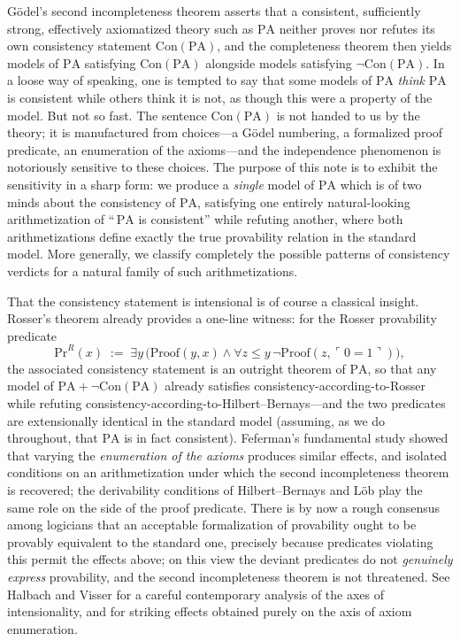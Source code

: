\documentclass[11pt]{amsart}
\theoremstyle{definition}
\theoremstyle{remark}
\newcommand{\PA}{\mathrm{PA}}
\newcommand{\Con}{\mathrm{Con}}
\newcommand{\Pf}{\mathrm{Proof}}
\newcommand{\Prov}{\mathrm{Pr}}
\newcommand{\godel}[1]{\ulcorner #1 \urcorner}
\begin{document}
G\"odel's second incompleteness theorem asserts that a consistent,
sufficiently strong, effectively axiomatized theory such as $\PA$ neither
proves nor refutes its own consistency statement $\Con(\PA)$, and the
completeness theorem then yields models of $\PA$ satisfying $\Con(\PA)$
alongside models satisfying $\neg\Con(\PA)$. In a loose way of speaking,
one is tempted to say that some models of $\PA$ \emph{think} $\PA$ is
consistent while others think it is not, as though this were a property of
the model. But not so fast. The sentence $\Con(\PA)$ is not handed to us
by the theory; it is manufactured from choices---a G\"odel numbering, a
formalized proof predicate, an enumeration of the axioms---and the
independence phenomenon is notoriously sensitive to these choices. The
purpose of this note is to exhibit the sensitivity in a sharp form:
we produce a \emph{single} model of $\PA$ which is of two minds about the
consistency of $\PA$, satisfying one entirely natural-looking
arithmetization of ``$\,\PA$ is consistent'' while refuting another, where
both arithmetizations define exactly the true provability relation in the
standard model. More generally, we classify completely the possible
patterns of consistency verdicts for a natural family of such
arithmetizations.

That the consistency statement is intensional is of course a classical
insight. Rosser's theorem \cite{Rosser1936} already provides a one-line
witness: for the Rosser provability predicate
\[
\Prov^{R}(x) \;:=\; \exists y\,\bigl(\Pf(y,x)\wedge
   \forall z\le y\,\neg\Pf(z,\godel{0{=}1})\bigr),
\]
the associated consistency statement is an outright theorem of $\PA$, so
that any model of $\PA+\neg\Con(\PA)$ already satisfies
consistency-according-to-Rosser while refuting
consistency-according-to-Hilbert--Bernays---and the two predicates are
extensionally identical in the standard model (assuming, as we do
throughout, that $\PA$ is in fact consistent). Feferman's fundamental
study \cite{Feferman1960} showed that varying the \emph{enumeration of the
axioms} produces similar effects, and isolated conditions on an
arithmetization under which the second incompleteness theorem is
recovered; the derivability conditions of Hilbert--Bernays and L\"ob play
the same role on the side of the proof predicate. There is by now a rough
consensus among logicians that an acceptable formalization of provability
ought to be provably equivalent to the standard one, precisely because
predicates violating this permit the effects above; on this view the
deviant predicates do not \emph{genuinely express} provability, and the
second incompleteness theorem is not threatened. See Halbach and Visser
\cite{HalbachVisser2014a,HalbachVisser2014b} for a careful contemporary
analysis of the axes of intensionality, and \cite{Hamkins2022qeios} for
striking effects obtained purely on the axis of axiom enumeration.
\end{document}
